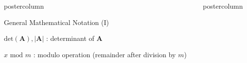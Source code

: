 \documentclass[11pt,compress,t,notes=noshow, xcolor=table]{beamer}
\newlength{\columnheight} %
\begin{document}
\begin{frame}[fragile]{}
\begin{columns}
\begin{column}{.31\textwidth}
\begin{beamercolorbox}[center]{postercolumn}
\begin{minipage}{.98\textwidth}
{\begin{myblock}{General Mathematical Notation (I)}
						\\
						\begin{codebox}
						    $\text{det}\left(\bm{A}\right), |\bm{A}|$ : determinant of $\bm{A}$
						\end{codebox}
						\hspace*{1ex}
						\begin{codebox}
							$x \text{ mod } m$ : modulo operation (remainder after division by $m$)
						\end{codebox}
					\end{myblock}
				}
			\end{minipage}
		\end{beamercolorbox}
	\end{column}
	\begin{column}{.31\textwidth}
		\begin{beamercolorbox}[center]{postercolumn}
			\begin{minipage}{.98\textwidth}
				\parbox[t][\columnheight]{\textwidth}{


}
\end{minipage}
\end{beamercolorbox}
\end{column}
\end{columns}
\end{frame}
\end{document}
